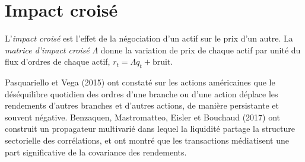 \begin{omfigure}

\label{fig:mx:metaorders-latent-liquidity-and-cross-impact:path}
\end{omfigure}

\section{Impact croisé}

\begin{definition}\label{def:mx:metaorders-latent-liquidity-and-cross-impact:cross}
L'\emph{impact croisé} est l'effet de la négociation d'un actif sur le prix d'un autre. La \emph{matrice d'impact croisé}
$\Lambda$ donne la variation de prix de chaque actif par unité du flux d'ordres de chaque actif, $r_t=\Lambda q_t+\text{bruit}$.
\end{definition}

Pasquariello et Vega (2015) ont constaté sur les actions américaines que le déséquilibre quotidien des ordres d'une branche ou d'une action déplace les rendements d'autres branches et d'autres actions,
de manière persistante et souvent négative. Benzaquen, Mastromatteo, Eisler et Bouchaud (2017) ont construit un propagateur multivarié dans lequel la liquidité partage la
structure sectorielle des corrélations, et ont montré que les transactions médiatisent une part significative de la covariance des rendements.


